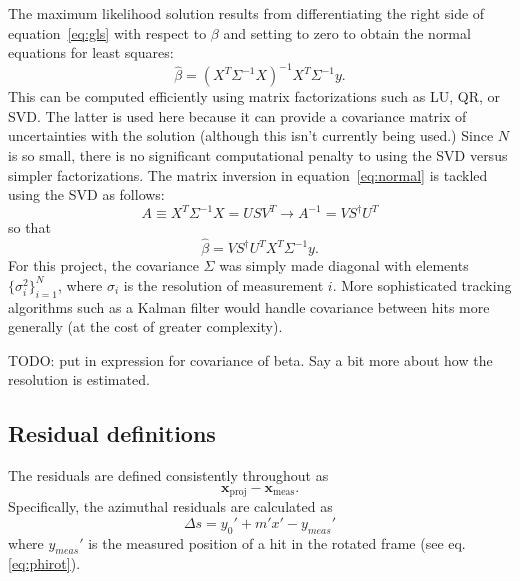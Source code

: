 \documentclass[12pt]{article}
\begin{document}
The maximum likelihood solution results from differentiating the right side of equation~\ref{eq:gls} with respect to $\beta$ and setting to zero to obtain the normal equations for least squares:
 \begin{equation}\label{eq:normal}
 \hat\beta = (X^T \Sigma^{-1} X)^{-1} X^T \Sigma^{-1} y.
 \end{equation}
This can be computed efficiently using matrix factorizations such as LU, QR, or SVD. The latter is used here because it can provide a covariance matrix of uncertainties with the solution (although this isn't currently being used.) Since $N$ is so small, there is no significant computational penalty to using the SVD versus simpler factorizations. The matrix inversion in equation~\ref{eq:normal} is tackled using the SVD as follows:
\begin{equation}\label{eq:svd}
A \equiv X^T \Sigma^{-1} X = U S V^T \to A^{-1} = V S^{\dagger} U^{T}
\end{equation}
so that 
\begin{equation}\label{eq:betahat}
\hat\beta = V S^{\dagger} U^{T} X^T \Sigma^{-1} y.
\end{equation}
For this project, the covariance $\Sigma$ was simply made diagonal with elements $\{\sigma_i^2 \}_{i=1}^N$, where $\sigma_i$ is the resolution of measurement $i$. More sophisticated tracking algorithms such as a Kalman filter would handle covariance between hits more generally (at the cost of greater complexity).

TODO: put in expression for covariance of beta. Say a bit more about how the resolution is estimated.

\subsection{Residual definitions}
The residuals are defined consistently throughout as 
\begin{equation}\label{eq:resdef}
\mathbf{x}_{\mathrm{proj}} - \mathbf{x}_{\mathrm{meas}}.
\end{equation}
Specifically, the azimuthal residuals are calculated as
\begin{equation} \label{eq:ds}
\Delta s = y_0' + m' x' - y_{meas}'
\end{equation}
where $y_{meas}'$ is the measured position of a hit in the rotated frame (see eq. \ref{eq:phirot}). 
\end{document}
